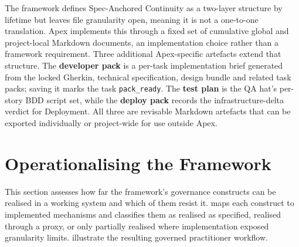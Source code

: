 The framework defines Spec-Anchored Continuity as a two-layer structure by lifetime but leaves file granularity open, meaning it is not a one-to-one translation. Apex implements this through a fixed set of cumulative global and project-local Markdown documents, an implementation choice rather than a framework requirement. Three additional Apex-specific artefacts extend that structure. The \textbf{developer pack} is a per-task implementation brief generated from the locked Gherkin, technical specification, design bundle and related task packs; saving it marks the task \texttt{pack\_ready}. The \textbf{test plan} is the \ac{QA} hat's per-story \ac{BDD} script set, while the \textbf{deploy pack} records the infrastructure-delta verdict for Deployment. All three are revisable Markdown artefacts that can be exported individually or project-wide for use outside Apex.

\section{Operationalising the Framework}
\label{sec:apex_framework_mapping}


This section assesses how far the framework's governance constructs can be realised in a working system and which of them resist it.  maps each construct to implemented mechanisms and classifies them as realised as specified, realised through a proxy, or only partially realised where implementation exposed granularity limits.  illustrate the resulting governed practitioner workflow.

